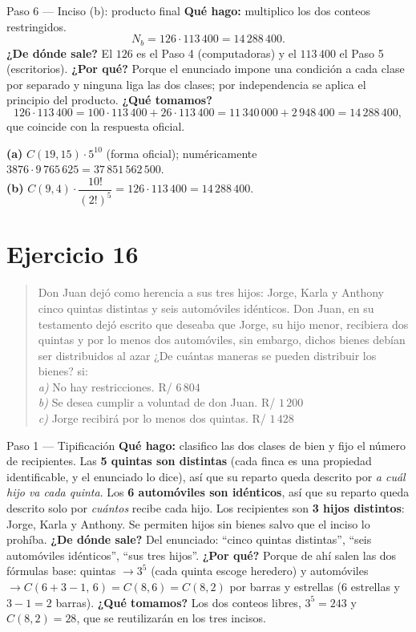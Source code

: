 \documentclass[11pt]{article}
\begin{document}
\begin{paso}{Paso 6 --- Inciso (b): producto final}
\textbf{Qué hago:} multiplico los dos conteos restringidos.
\[
N_b=126\cdot 113\,400=14\,288\,400 .
\]
\textbf{¿De dónde sale?} El $126$ es el Paso 4 (computadoras) y el $113\,400$ el Paso 5 (escritorios).
\textbf{¿Por qué?} Porque el enunciado impone una condición a cada clase por separado y ninguna liga las dos clases; por independencia se aplica el principio del producto.
\textbf{¿Qué tomamos?}
\[
126\cdot 113\,400=100\cdot113\,400+26\cdot113\,400=11\,340\,000+2\,948\,400=14\,288\,400 ,
\]
que coincide con la respuesta oficial.
\end{paso}

\begin{resp}
\textbf{(a)} $C(19,15)\cdot 5^{10}$ (forma oficial); numéricamente $3876\cdot 9\,765\,625=37\,851\,562\,500$.\\
\textbf{(b)} $C(9,4)\cdot\dfrac{10!}{(2!)^5}=126\cdot 113\,400=14\,288\,400$.
\end{resp}

\section*{Ejercicio 16}

\begin{quote}
Don Juan dejó como herencia a sus tres hijos: Jorge, Karla y Anthony cinco quintas distintas y seis automóviles idénticos. Don Juan, en su testamento dejó escrito que deseaba que Jorge, su hijo menor, recibiera dos quintas y por lo menos dos automóviles, sin embargo, dichos bienes debían ser distribuidos al azar ¿De cuántas maneras se pueden distribuir los bienes? si:\\
\textit{a)} No hay restricciones. \hfill R/ $6\,804$\\
\textit{b)} Se desea cumplir a voluntad de don Juan. \hfill R/ $1\,200$\\
\textit{c)} Jorge recibirá por lo menos dos quintas. \hfill R/ $1\,428$
\end{quote}

\begin{paso}{Paso 1 --- Tipificación}
\textbf{Qué hago:} clasifico las dos clases de bien y fijo el número de recipientes.
Las \textbf{5 quintas son distintas} (cada finca es una propiedad identificable, y el enunciado lo dice), así que su reparto queda descrito por \emph{a cuál hijo va cada quinta}. Los \textbf{6 automóviles son idénticos}, así que su reparto queda descrito solo por \emph{cuántos} recibe cada hijo. Los recipientes son \textbf{3 hijos distintos}: Jorge, Karla y Anthony. Se permiten hijos sin bienes salvo que el inciso lo prohíba.
\textbf{¿De dónde sale?} Del enunciado: ``cinco quintas distintas'', ``seis automóviles idénticos'', ``sus tres hijos''.
\textbf{¿Por qué?} Porque de ahí salen las dos fórmulas base: quintas $\to 3^5$ (cada quinta escoge heredero) y automóviles $\to C(6+3-1,\,6)=C(8,6)=C(8,2)$ por barras y estrellas ($6$ estrellas y $3-1=2$ barras).
\textbf{¿Qué tomamos?} Los dos conteos libres, $3^5=243$ y $C(8,2)=28$, que se reutilizarán en los tres incisos.
\end{paso}
\end{document}
